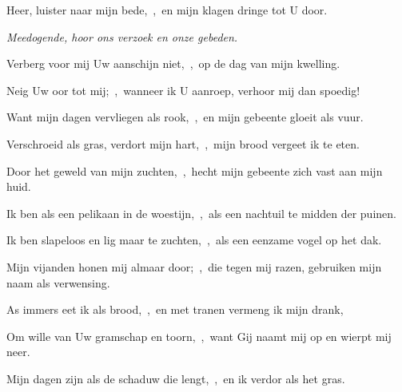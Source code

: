\documentclass[12pt,twoside,a5paper]{article}
\begin{document}



\begin{halfparskip}
  Heer, luister naar mijn bede,~\sep\ en mijn klagen dringe tot U door.


   \emph{Meedogende, hoor ons verzoek en onze gebeden.}

  Verberg voor mij Uw aanschijn niet,~\sep\ op de dag van mijn kwelling.

  Neig Uw oor tot mij;~\sep\ wanneer ik U aanroep, verhoor mij dan spoedig!

  Want mijn dagen vervliegen als rook,~\sep\ en mijn gebeente gloeit als vuur.

  Verschroeid als gras, verdort mijn hart,~\sep\ mijn brood vergeet ik te eten.

  Door het geweld van mijn zuchten,~\sep\ hecht mijn gebeente zich vast aan mijn huid.

  Ik ben als een pelikaan in de woestijn,~\sep\ als een nachtuil te midden der puinen.

  Ik ben slapeloos en lig maar te zuchten,~\sep\ als een eenzame vogel op het dak.

  Mijn vijanden honen mij almaar door;~\sep\ die tegen mij razen, gebruiken mijn naam als verwensing.

  As immers eet ik als brood,~\sep\ en met tranen vermeng ik mijn drank,

  Om wille van Uw gramschap en toorn,~\sep\ want Gij naamt mij op en wierpt mij neer.

  Mijn dagen zijn als de schaduw die lengt,~\sep\ en ik verdor als het gras.
\end{halfparskip}

\end{document}
